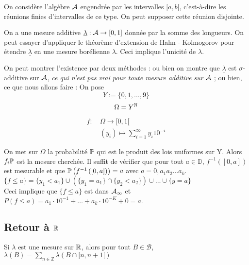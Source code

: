 \documentclass[10pt,a4paper,notitlepage ]{report}
\begin{document}
\begin{demo}

On considère l'algèbre $\mathcal A$ engendrée par les intervalles $[a,b[$, c'est-à-dire les réunions finies d'intervalles de ce type. On peut supposer cette réunion disjointe.

On a une mesure additive $\underline\lambda : \mathcal A \rightarrow [0,1] $ donnée par la somme des longueurs. On peut essayer d'appliquer le théorème d'extension de Hahn - Kolmogorov pour étendre $\underline\lambda$ en une mesure borélienne $\lambda$. Ceci implique l'unicité de $\lambda$.

On peut montrer l'existence par deux méthodes : ou bien on montre que $\underline{\lambda} $ est $\sigma$-additive sur $\mathcal A$, \emph{ce qui n'est pas vrai pour toute mesure additive sur $\mathcal A$} ; ou bien, ce que nous allons faire : On pose 
\[Y := \lbrace 0,1, \ldots , 9 \rbrace \]
\[ \Omega = Y ^\mathbb N \]


\begin{align*}
f : \ &\Omega \rightarrow [0,1[ \\
&(y_i) \mapsto \sum_{i=1}^\infty y_i 10^{-i} 
\end{align*}


On met sur $\Omega$ la probabilité $\mathbb P$ qui est le produit des lois uniformes sur Y. Alors $f_i \mathbb P $ est la mesure cherchée.
Il suffit de vérifier que pour tout $a \in \mathbb{D} $, $f^{-1} \left( [0,a]  \right) $ est mesurable et que 
$\mathbb P \left( f^{-1} \left( [0,a]  \right) \right) = a $ avec $ a = 0, a_1 a_2 \ldots a_k $. \\

$\lbrace f \leq a \rbrace = \lbrace y_1 < a_1 \rbrace \cup (\lbrace y_1 = a_1 \rbrace \cap \lbrace y_2 < a_2 \rbrace) \cup \dots \cup \lbrace y = a \rbrace $ \\

Ceci implique que $\lbrace f \leq a \rbrace$ est dans $ \mathcal A_{\infty} $ et $P (f \leq a ) = a_1 \cdot 10^{-1} + \dots + a_k \cdot 10 ^ {-K} + 0 = a $.

\end{demo}

\subsection{Retour à $\mathbb R$}

Si $\lambda $ est une mesure sur $\mathbb R$, alors pour tout $B \in \mathcal{B}$, $\lambda (B) = \sum \limits_{n \in \mathbb{Z} } \lambda (B \cap [n, n+1[ ) $ \\
\end{document}
